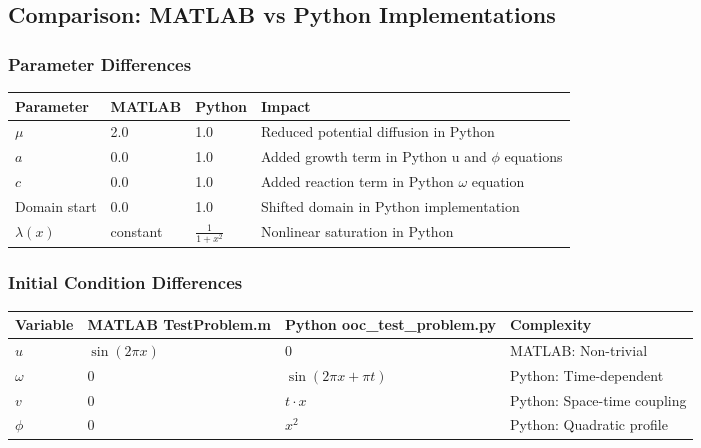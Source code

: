 \subsection{Comparison: MATLAB vs Python Implementations}
\label{subsec:matlab_vs_python_comparison}

\subsubsection{Parameter Differences}

\begin{longtable}{|p{3cm}|p{2cm}|p{2cm}|p{6cm}|}
\hline
\textbf{Parameter} & \textbf{MATLAB} & \textbf{Python} & \textbf{Impact} \\
\hline
\endhead

$\mu$ & 2.0 & 1.0 & Reduced potential diffusion in Python \\
\hline

$a$ & 0.0 & 1.0 & Added growth term in Python u and $\phi$ equations \\
\hline

$c$ & 0.0 & 1.0 & Added reaction term in Python $\omega$ equation \\
\hline

Domain start & 0.0 & 1.0 & Shifted domain in Python implementation \\
\hline

$\lambda(x)$ & constant & $\frac{1}{1+x^2}$ & Nonlinear saturation in Python \\
\hline

\end{longtable}

\subsubsection{Initial Condition Differences}

\begin{longtable}{|p{2cm}|p{4cm}|p{4cm}|p{3cm}|}
\hline
\textbf{Variable} & \textbf{MATLAB TestProblem.m} & \textbf{Python ooc\_test\_problem.py} & \textbf{Complexity} \\
\hline
\endhead

$u$ & $\sin(2\pi x)$ & $0$ & MATLAB: Non-trivial \\
\hline

$\omega$ & $0$ & $\sin(2\pi x + \pi t)$ & Python: Time-dependent \\
\hline

$v$ & $0$ & $t \cdot x$ & Python: Space-time coupling \\
\hline

$\phi$ & $0$ & $x^2$ & Python: Quadratic profile \\
\hline

\end{longtable}

